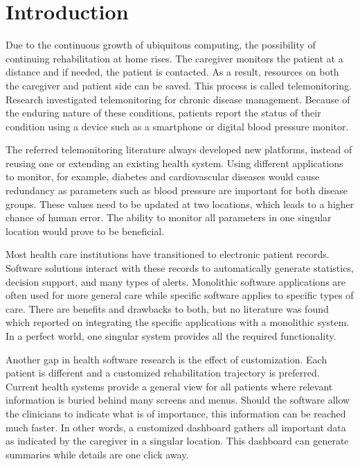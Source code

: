 \section{Introduction}

Due to the continuous growth of ubiquitous computing, the possibility of continuing rehabilitation at home rises. The caregiver monitors the patient at a distance and if needed, the patient is contacted. As a result, resources on both the caregiver and patient side can be saved. This process is called telemonitoring. Research investigated telemonitoring for chronic disease management. Because of the enduring nature of these conditions, patients report the status of their condition using a device such as a smartphone or digital blood pressure monitor.

The referred telemonitoring literature always developed new platforms, instead of reusing one or extending an existing health system. Using different applications to monitor, for example, diabetes and cardiovascular diseases would cause redundancy as parameters such as blood pressure are important for both disease groups. These values need to be updated at two locations, which leads to a higher chance of human error. The ability to monitor all parameters in one singular location would prove to be beneficial.

Most health care institutions have transitioned to electronic patient records. Software solutions interact with these records to automatically generate statistics, decision support, and many types of alerts. Monolithic software applications are often used for more general care while specific software applies to specific types of care. There are benefits and drawbacks to both, but no literature was found which reported on integrating the specific applications with a monolithic system. In a perfect world, one singular system provides all the required functionality.

Another gap in health software research is the effect of customization. Each patient is different and a customized rehabilitation trajectory is preferred. Current health systems provide a general view for all patients where relevant information is buried behind many screens and menus. Should the software allow the clinicians to indicate what is of importance, this information can be reached much faster. In other words, a customized dashboard gathers all important data as indicated by the caregiver in a singular location. This dashboard can generate summaries while details are one click away. 

